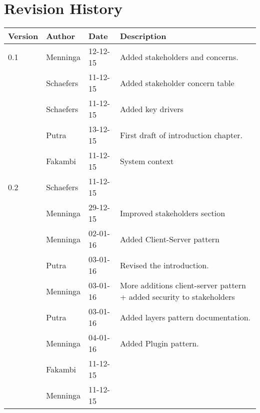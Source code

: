 \section*{Revision History}
\begin{longtable}{L{} L{} L{} L{}}
	\textbf{Version} & \textbf{Author}       & \textbf{Date} & \textbf{Description}                                                                                                                                                                                                       \\ \endhead	\toprule
				0.1 & Menninga  & 12-12-15 & Added stakeholders and concerns. \\
					& Schaefers & 11-12-15 & Added stakeholder concern table\\
					& Schaefers & 11-12-15 & Added key drivers\\
					& Putra		& 13-12-15 & First draft of introduction chapter. \\
					& Fakambi   & 11-12-15 & System context\\
				\midrule
			
				0.2 & Schaefers & 11-12-15 & \\
					& Menninga  & 29-12-15 & Improved stakeholders section \\
					& Menninga  & 02-01-16 & Added Client-Server pattern \\
					& Putra		& 03-01-16 & Revised the introduction. \\
					& Menninga  & 03-01-16 & More additions client-server pattern + added security to stakeholders \\
					& Putra		& 03-01-16 & Added layers pattern documentation. \\
					& Menninga	& 04-01-16 & Added Plugin pattern. \\
					& Fakambi   & 11-12-15 & \\
					& Menninga  & 11-12-15 & \\
				\midrule

%			
\end{longtable}